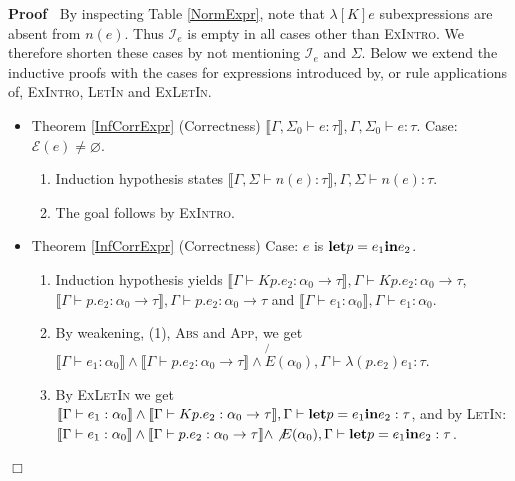 \documentclass{article}
\newcommand{\tmname}[1]{\textsc{#1}}
\newcommand{\tmstrong}[1]{\textbf{#1}}
\newenvironment{proof}{\noindent\textbf{Proof\ }}{\hspace*{\fill}$\Box$\medskip}
\begin{document}
\begin{proof}
  By inspecting Table \ref{NormExpr}, note that $\lambda [K] e$ subexpressions
  are absent from $n (e)$. Thus $\mathcal{I}_e$ is empty in all cases other
  than {\tmname{ExIntro}}. We therefore shorten these cases by not mentioning
  $\mathcal{I}_e$ and $\Sigma$. Below we extend the inductive proofs with the
  cases for expressions introduced by, or rule applications of,
  {\tmname{ExIntro}}, {\tmname{LetIn}} and {\tmname{ExLetIn}}.
  \begin{itemize}
    \item Theorem \ref{InfCorrExpr} (Correctness) $\llbracket \Gamma, \Sigma_0
    \vdash e : \tau \rrbracket, \Gamma, \Sigma_0 \vdash e : \tau$. Case:
    $\mathcal{E} (e) \neq \varnothing$.
    \begin{enumerate}
      \item Induction hypothesis states $\llbracket \Gamma, \Sigma \vdash n
      (e) : \tau \rrbracket, \Gamma, \Sigma \vdash n (e) : \tau$.
      
      \item The goal follows by {\tmname{ExIntro}}.
    \end{enumerate}
    \item Theorem \ref{InfCorrExpr} (Correctness) Case: $e$ is
    $\text{{\tmstrong{let}}} p = e_1  \text{{\tmstrong{in}}} e_2$.
    \begin{enumerate}
      \item Induction hypothesis yields $\llbracket \Gamma \vdash K p.e_2 :
      \alpha_0 \rightarrow \tau \rrbracket, \Gamma \vdash K p.e_2 : \alpha_0
      \rightarrow \tau$, $\llbracket \Gamma \vdash p.e_2 : \alpha_0
      \rightarrow \tau \rrbracket, \Gamma \vdash p.e_2 : \alpha_0 \rightarrow
      \tau$ and $\llbracket \Gamma \vdash e_1 : \alpha_0 \rrbracket, \Gamma
      \vdash e_1 : \alpha_0$.
      
      \item By weakening, (1), {\tmname{Abs}} and {\tmname{App}}, we get
      $\llbracket \Gamma \vdash e_1 : \alpha_0 \rrbracket \wedge \llbracket
      \Gamma \vdash p.e_2 : \alpha_0 \rightarrow \tau \rrbracket \wedge
      \not{E} (\alpha_0), \Gamma \vdash \lambda (p.e_2) e_1 : \tau$.
      
      \item By {\tmname{ExLetIn}} we get $\llbracket \Gamma \vdash e_1 :
      \alpha_0 \rrbracket \wedge \llbracket \Gamma \vdash K p.e_2 : \alpha_0
      \rightarrow \tau \rrbracket, \Gamma \vdash \text{{\tmstrong{let}}} p =
      e_1  \text{{\tmstrong{in}}} e_2 : \tau$, and by {\tmname{LetIn}}:
      $\llbracket \Gamma \vdash e_1 : \alpha_0 \rrbracket \wedge \llbracket
      \Gamma \vdash p.e_2 : \alpha_0 \rightarrow \tau \rrbracket \wedge
      \not{E} (\alpha_0), \Gamma \vdash \text{{\tmstrong{let}}} p = e_1 
      \text{{\tmstrong{in}}} e_2 : \tau$.
      

\end{enumerate}
\end{itemize}
\end{proof}
\end{document}
